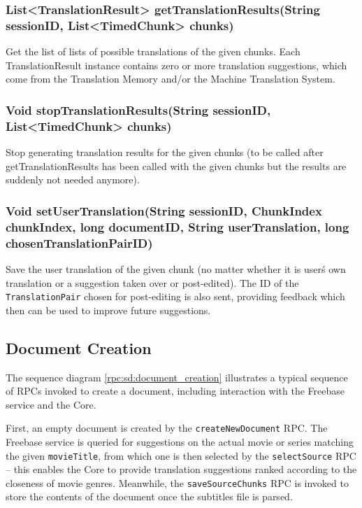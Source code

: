 {\subsubsection{List<TranslationResult> getTranslationResults(String sessionID, List<TimedChunk> chunks)}
Get the list of lists of possible translations of the given chunks.
Each TranslationResult instance contains zero or more translation suggestions, which come from the Translation Memory and/or the Machine Translation System.

\subsubsection{Void stopTranslationResults(String sessionID, List<TimedChunk> chunks)}
Stop generating translation results for the given chunks
(to be called after getTranslationResults has been called
with the given chunks but the results are suddenly not needed anymore).

\subsubsection{Void setUserTranslation(String sessionID, ChunkIndex chunkIndex, long documentID, String userTranslation, long chosenTranslationPairID)}
Save the user translation of the given chunk (no matter whether it is user\'s own translation or a suggestion taken over or post-edited).
The ID of the {\tt TranslationPair} chosen for post-editing is also sent, providing feedback which then can be used to improve future suggestions.

\subsection{Document Creation}

The sequence diagram \ref{rpc:sd:document_creation} illustrates a typical sequence of RPCs invoked to create a document, including interaction with the Freebase service and the Core.

First, an empty document is created by the {\tt createNewDocument} RPC. The Freebase service is queried for suggestions on the actual movie or series matching the given {\tt movieTitle}, from which one is then selected by the {\tt selectSource} RPC -- this enables the Core to provide translation suggestions ranked according to the closeness of movie genres. Meanwhile, the {\tt saveSourceChunks} RPC is invoked to store the contents of the document once the subtitles file is parsed.

}
